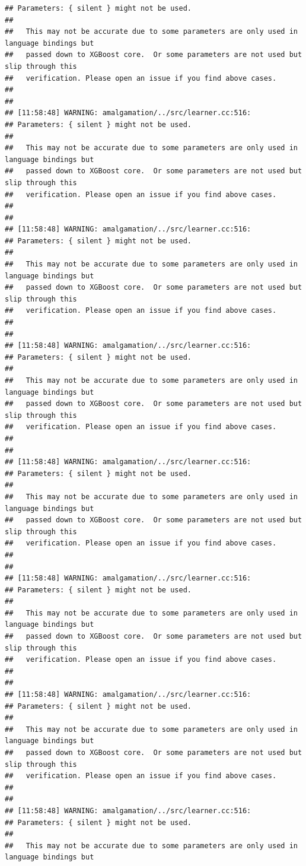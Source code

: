 \documentclass[AMS,STIX2COL]{WileyNJD-v2}\usepackage[]{graphicx}\usepackage[]{color}
\makeatletter
\newenvironment{kframe}{%
 \def\at@end@of@kframe{}%
 \ifinner\ifhmode%
  \def\at@end@of@kframe{\end{minipage}}%
  \begin{minipage}{\columnwidth}%
 \fi\fi%
 \def\FrameCommand##1{\hskip\@totalleftmargin \hskip-\fboxsep
 \colorbox{shadecolor}{##1}\hskip-\fboxsep
     \hskip-\linewidth \hskip-\@totalleftmargin \hskip\columnwidth}%
 \MakeFramed {\advance\hsize-\width
   \@totalleftmargin\z@ \linewidth\hsize
   \@setminipage}}%
 {\par\unskip\endMakeFramed%
 \at@end@of@kframe}
\newenvironment{knitrout}{}{} %
\makeatother
\begin{document}
\begin{knitrout}
\begin{kframe}
\begin{verbatim}
## Parameters: { silent } might not be used.
## 
##   This may not be accurate due to some parameters are only used in language bindings but
##   passed down to XGBoost core.  Or some parameters are not used but slip through this
##   verification. Please open an issue if you find above cases.
## 
## 
## [11:58:48] WARNING: amalgamation/../src/learner.cc:516: 
## Parameters: { silent } might not be used.
## 
##   This may not be accurate due to some parameters are only used in language bindings but
##   passed down to XGBoost core.  Or some parameters are not used but slip through this
##   verification. Please open an issue if you find above cases.
## 
## 
## [11:58:48] WARNING: amalgamation/../src/learner.cc:516: 
## Parameters: { silent } might not be used.
## 
##   This may not be accurate due to some parameters are only used in language bindings but
##   passed down to XGBoost core.  Or some parameters are not used but slip through this
##   verification. Please open an issue if you find above cases.
## 
## 
## [11:58:48] WARNING: amalgamation/../src/learner.cc:516: 
## Parameters: { silent } might not be used.
## 
##   This may not be accurate due to some parameters are only used in language bindings but
##   passed down to XGBoost core.  Or some parameters are not used but slip through this
##   verification. Please open an issue if you find above cases.
## 
## 
## [11:58:48] WARNING: amalgamation/../src/learner.cc:516: 
## Parameters: { silent } might not be used.
## 
##   This may not be accurate due to some parameters are only used in language bindings but
##   passed down to XGBoost core.  Or some parameters are not used but slip through this
##   verification. Please open an issue if you find above cases.
## 
## 
## [11:58:48] WARNING: amalgamation/../src/learner.cc:516: 
## Parameters: { silent } might not be used.
## 
##   This may not be accurate due to some parameters are only used in language bindings but
##   passed down to XGBoost core.  Or some parameters are not used but slip through this
##   verification. Please open an issue if you find above cases.
## 
## 
## [11:58:48] WARNING: amalgamation/../src/learner.cc:516: 
## Parameters: { silent } might not be used.
## 
##   This may not be accurate due to some parameters are only used in language bindings but
##   passed down to XGBoost core.  Or some parameters are not used but slip through this
##   verification. Please open an issue if you find above cases.
## 
## 
## [11:58:48] WARNING: amalgamation/../src/learner.cc:516: 
## Parameters: { silent } might not be used.
## 
##   This may not be accurate due to some parameters are only used in language bindings but

\end{verbatim}
\end{kframe}
\end{knitrout}
\end{document}
